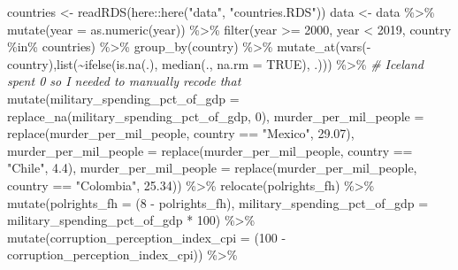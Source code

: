 \documentclass[
  english,
  man,floatsintext]{apa6}
\newenvironment{Shaded}{\begin{snugshade}}{\end{snugshade}}
\newcommand{\AttributeTok}[1]{\textcolor[rgb]{0.77,0.63,0.00}{#1}}
\newcommand{\CommentTok}[1]{\textcolor[rgb]{0.56,0.35,0.01}{\textit{#1}}}
\newcommand{\ConstantTok}[1]{\textcolor[rgb]{0.00,0.00,0.00}{#1}}
\newcommand{\DecValTok}[1]{\textcolor[rgb]{0.00,0.00,0.81}{#1}}
\newcommand{\FloatTok}[1]{\textcolor[rgb]{0.00,0.00,0.81}{#1}}
\newcommand{\FunctionTok}[1]{\textcolor[rgb]{0.00,0.00,0.00}{#1}}
\newcommand{\NormalTok}[1]{#1}
\newcommand{\OtherTok}[1]{\textcolor[rgb]{0.56,0.35,0.01}{#1}}
\newcommand{\SpecialCharTok}[1]{\textcolor[rgb]{0.00,0.00,0.00}{#1}}
\newcommand{\StringTok}[1]{\textcolor[rgb]{0.31,0.60,0.02}{#1}}
\begin{document}
\begin{Shaded}
\begin{Highlighting}[]
\NormalTok{countries }\OtherTok{\textless{}{-}} \FunctionTok{readRDS}\NormalTok{(here}\SpecialCharTok{::}\FunctionTok{here}\NormalTok{(}\StringTok{"data"}\NormalTok{, }\StringTok{"countries.RDS"}\NormalTok{))}
\NormalTok{data }\OtherTok{\textless{}{-}}\NormalTok{ data }\SpecialCharTok{\%\textgreater{}\%}
  \FunctionTok{mutate}\NormalTok{(}\AttributeTok{year =} \FunctionTok{as.numeric}\NormalTok{(year)) }\SpecialCharTok{\%\textgreater{}\%} 
  \FunctionTok{filter}\NormalTok{(year }\SpecialCharTok{\textgreater{}=} \DecValTok{2000}\NormalTok{, year }\SpecialCharTok{\textless{}} \DecValTok{2019}\NormalTok{, country }\SpecialCharTok{\%in\%}\NormalTok{ countries) }\SpecialCharTok{\%\textgreater{}\%} 
  \FunctionTok{group\_by}\NormalTok{(country) }\SpecialCharTok{\%\textgreater{}\%}
  \FunctionTok{mutate\_at}\NormalTok{(}\FunctionTok{vars}\NormalTok{(}\SpecialCharTok{{-}}\NormalTok{country),}\FunctionTok{list}\NormalTok{(}\SpecialCharTok{\textasciitilde{}}\FunctionTok{ifelse}\NormalTok{(}\FunctionTok{is.na}\NormalTok{(.), }\FunctionTok{median}\NormalTok{(., }\AttributeTok{na.rm =} \ConstantTok{TRUE}\NormalTok{), .))) }\SpecialCharTok{\%\textgreater{}\%} 
\CommentTok{\# Iceland spent 0 so I needed to manually recode that}
  \FunctionTok{mutate}\NormalTok{(}\AttributeTok{military\_spending\_pct\_of\_gdp =} \FunctionTok{replace\_na}\NormalTok{(military\_spending\_pct\_of\_gdp, }\DecValTok{0}\NormalTok{),}
         \AttributeTok{murder\_per\_mil\_people =} \FunctionTok{replace}\NormalTok{(murder\_per\_mil\_people, country }\SpecialCharTok{==} \StringTok{"Mexico"}\NormalTok{, }\FloatTok{29.07}\NormalTok{),}
         \AttributeTok{murder\_per\_mil\_people =} \FunctionTok{replace}\NormalTok{(murder\_per\_mil\_people, country }\SpecialCharTok{==} \StringTok{"Chile"}\NormalTok{, }\FloatTok{4.4}\NormalTok{),}
         \AttributeTok{murder\_per\_mil\_people =} \FunctionTok{replace}\NormalTok{(murder\_per\_mil\_people, country }\SpecialCharTok{==} \StringTok{"Colombia"}\NormalTok{, }\FloatTok{25.34}\NormalTok{)) }\SpecialCharTok{\%\textgreater{}\%} 
  \FunctionTok{relocate}\NormalTok{(polrights\_fh) }\SpecialCharTok{\%\textgreater{}\%} 
  \FunctionTok{mutate}\NormalTok{(}\AttributeTok{polrights\_fh =}\NormalTok{ (}\DecValTok{8} \SpecialCharTok{{-}}\NormalTok{ polrights\_fh),}
 \AttributeTok{military\_spending\_pct\_of\_gdp =}\NormalTok{ military\_spending\_pct\_of\_gdp }\SpecialCharTok{*} \DecValTok{100}\NormalTok{) }\SpecialCharTok{\%\textgreater{}\%} 
  \FunctionTok{mutate}\NormalTok{(}\AttributeTok{corruption\_perception\_index\_cpi =}\NormalTok{ (}\DecValTok{100} \SpecialCharTok{{-}}\NormalTok{ corruption\_perception\_index\_cpi)) }\SpecialCharTok{\%\textgreater{}\%} 

\end{Highlighting}
\end{Shaded}
\end{document}
